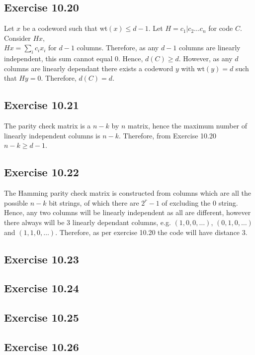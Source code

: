 \documentclass[a4paper,12pt]{article}
\begin{document}
\subsection*{Exercise 10.20}
Let $x$ be a codeword such that wt$(x)\leq d-1$. Let $H={c_1|c_2\ldots c_n}$ for code $C$. Consider $Hx$,\\
$Hx=\displaystyle \sum_ic_ix_i$ for $d-1$ columns. Therefore, as any $d-1$ columns are linearly
independent, this sum cannot equal $0$. Hence, $d(C)\geq d$. However, as any $d$ columns
are linearly dependant there exists a codeword $y$ with wt$(y)=d$ such that $Hy=0$. Therefore,
$d(C)=d$.
\subsection*{Exercise 10.21}
The parity check matrix is a $n-k$ by $n$ matrix, hence the maximum number of linearly independent
columns is $n-k$. Therefore, from Exercise 10.20 $n-k\geq d-1$.
\subsection*{Exercise 10.22}
The Hamming parity check matrix is constructed from columns which are all the possible
$n-k$ bit strings, of which there are $2^r-1$ of excluding the $0$ string. Hence, any
two columns will be linearly independent as all are different, however there always will be $3$
linearly dependant columns, e.g. $(1,0,0,\ldots)$, $(0,1,0,\ldots)$ and $(1,1,0,\ldots)$.
Therefore, as per exercise 10.20 the code will have distance $3$. 
\subsection*{Exercise 10.23}

\subsection*{Exercise 10.24}
\subsection*{Exercise 10.25}
\subsection*{Exercise 10.26}
\end{document}
